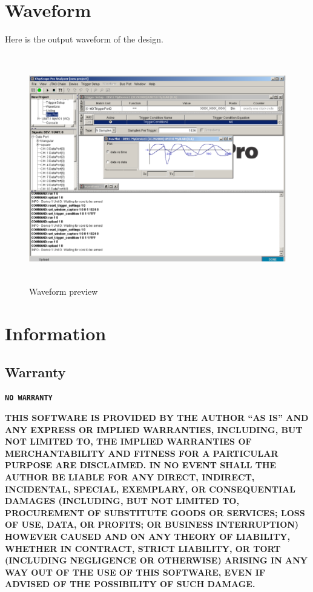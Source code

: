 \documentclass[a4paper,10pt]{article}
\begin{document}
\section{Waveform}

Here is the output waveform of the design.

\begin{figure}[H]
\center
\includegraphics[width=15cm,height=10cm]{screenshot.eps}
\caption {Waveform preview}
\end{figure}

\newpage

\section{Information}

\subsection{Warranty}

\begin{center}
		\textbf	     {\texttt{NO WARRANTY}}\\
\end{center}

\scriptsize
\textbf{\textrm{
THIS SOFTWARE IS PROVIDED BY THE AUTHOR ``AS IS'' AND ANY EXPRESS OR
IMPLIED WARRANTIES, INCLUDING, BUT NOT LIMITED TO, THE IMPLIED WARRANTIES
OF MERCHANTABILITY AND FITNESS FOR A PARTICULAR PURPOSE ARE DISCLAIMED.
IN NO EVENT SHALL THE AUTHOR BE LIABLE FOR ANY DIRECT, INDIRECT,
INCIDENTAL, SPECIAL, EXEMPLARY, OR CONSEQUENTIAL DAMAGES (INCLUDING, BUT
NOT LIMITED TO, PROCUREMENT OF SUBSTITUTE GOODS OR SERVICES; LOSS OF USE,
DATA, OR PROFITS; OR BUSINESS INTERRUPTION) HOWEVER CAUSED AND ON ANY
THEORY OF LIABILITY, WHETHER IN CONTRACT, STRICT LIABILITY, OR TORT
(INCLUDING NEGLIGENCE OR OTHERWISE) ARISING IN ANY WAY OUT OF THE USE OF
THIS SOFTWARE, EVEN IF ADVISED OF THE POSSIBILITY OF SUCH DAMAGE.
}}
\normalsize
\end{document}
